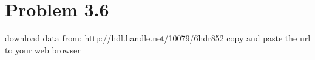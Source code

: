 \documentclass[a4paper]{article}
\begin{document}
\section*{Problem 3.6}
download data from: http://hdl.handle.net/10079/6hdr852
copy and paste the url to your web browser
\begin{stlog}\end{stlog}
\end{document}
